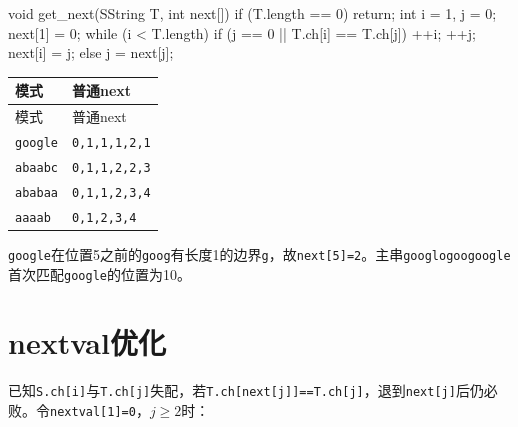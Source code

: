 \par\smallskip\noindent\begin{minipage}{\linewidth}
\begin{codeblock}[language={C++}]
void get_next(SString T, int next[]) {
    if (T.length == 0) return;
    int i = 1, j = 0;
    next[1] = 0;
    while (i < T.length) {
        if (j == 0 || T.ch[i] == T.ch[j]) {
            ++i; ++j;
            next[i] = j;
        } else {
            j = next[j];
        }
    }
}
\end{codeblock}
\end{minipage}\par\smallskip

\par\smallskip
{\fontsize{9.3}{12}\selectfont\setlength{\tabcolsep}{2.5pt}\setlength{\LTleft}{0pt}\setlength{\LTright}{0pt}
\begin{longtable}{@{}>{\raggedright\arraybackslash}p{}>{\raggedright\arraybackslash}p{}@{}}
\toprule
模式 & 普通next \\

\midrule\endfirsthead\toprule
模式 & 普通next \\

\midrule\endhead\bottomrule\endfoot
\texttt{google} & \texttt{0,1,1,1,2,1} \\

\texttt{abaabc} & \texttt{0,1,1,2,2,3} \\

\texttt{ababaa} & \texttt{0,1,1,2,3,4} \\

\texttt{aaaab} & \texttt{0,1,2,3,4} \\

\end{longtable}}
\par\smallskip

\texttt{google}在位置5之前的\texttt{goog}有长度1的边界\texttt{g}，故\texttt{next[\allowbreak{}5]\allowbreak{}=\allowbreak{}2}。主串\texttt{googlogoogoogle}首次匹配\texttt{google}的位置为10。

\section{nextval优化}\label{DS04-nextval}

已知\texttt{S.\allowbreak{}ch[\allowbreak{}i]\allowbreak{}}与\texttt{T.\allowbreak{}ch[\allowbreak{}j]\allowbreak{}}失配，若\texttt{T.\allowbreak{}ch[\allowbreak{}next[\allowbreak{}j]\allowbreak{}]\allowbreak{}=\allowbreak{}=\allowbreak{}T.\allowbreak{}ch[\allowbreak{}j]\allowbreak{}}，退到\texttt{next[\allowbreak{}j]\allowbreak{}}后仍必败。令\texttt{nextval[\allowbreak{}1]\allowbreak{}=\allowbreak{}0}，\(j\ge2\)时：

